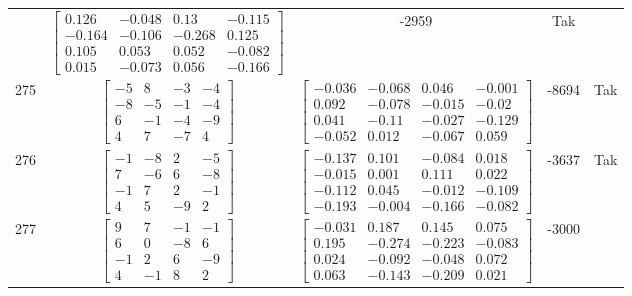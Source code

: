 \documentclass[a4paper,12pt]{article}
\begin{document}
\begin{tabular}{c c c c c}
&
$\begin{bmatrix} 0.126 & -0.048 & 0.13 & -0.115 \\ -0.164 & -0.106 & -0.268 & 0.125 \\ 0.105 & 0.053 & 0.052 & -0.082 \\ 0.015 & -0.073 & 0.056 & -0.166 \end{bmatrix}$
&
-2959
&
Tak
\\
275
&
$\begin{bmatrix} -5 & 8 & -3 & -4 \\ -8 & -5 & -1 & -4 \\ 6 & -1 & -4 & -9 \\ 4 & 7 & -7 & 4 \end{bmatrix}$
&
$\begin{bmatrix} -0.036 & -0.068 & 0.046 & -0.001 \\ 0.092 & -0.078 & -0.015 & -0.02 \\ 0.041 & -0.11 & -0.027 & -0.129 \\ -0.052 & 0.012 & -0.067 & 0.059 \end{bmatrix}$
&
-8694
&
Tak
\\
276
&
$\begin{bmatrix} -1 & -8 & 2 & -5 \\ 7 & -6 & 6 & -8 \\ -1 & 7 & 2 & -1 \\ 4 & 5 & -9 & 2 \end{bmatrix}$
&
$\begin{bmatrix} -0.137 & 0.101 & -0.084 & 0.018 \\ -0.015 & 0.001 & 0.111 & 0.022 \\ -0.112 & 0.045 & -0.012 & -0.109 \\ -0.193 & -0.004 & -0.166 & -0.082 \end{bmatrix}$
&
-3637
&
Tak
\\
277
&
$\begin{bmatrix} 9 & 7 & -1 & -1 \\ 6 & 0 & -8 & 6 \\ -1 & 2 & 6 & -9 \\ 4 & -1 & 8 & 2 \end{bmatrix}$
&
$\begin{bmatrix} -0.031 & 0.187 & 0.145 & 0.075 \\ 0.195 & -0.274 & -0.223 & -0.083 \\ 0.024 & -0.092 & -0.048 & 0.072 \\ 0.063 & -0.143 & -0.209 & 0.021 \end{bmatrix}$
&
-3000
&

\end{tabular}
\end{document}
